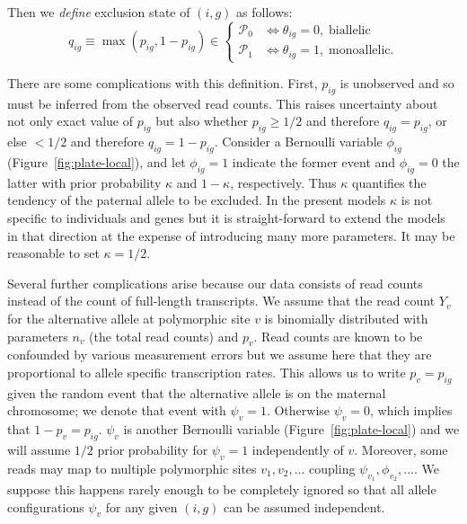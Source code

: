 \documentclass[letterpaper]{article}
\begin{document}
Then we \emph{define} exclusion state of \((i,g)\) as follows:
\begin{equation}
\label{eq:def-exclusion-state}
q_{ig} \equiv \max(p_{ig},1-p_{ig}) \in
\begin{cases}
\mathcal{P}_0 & \Leftrightarrow \theta_{ig}=0, \; \text{biallelic} \\
\mathcal{P}_1 & \Leftrightarrow \theta_{ig}=1, \; \text{monoallelic}.
\end{cases}
\end{equation}

There are some complications with this definition.  First, \(p_{ig}\) is
unobserved and so must be inferred from the observed read counts.  This raises
uncertainty about not only exact value of \(p_{ig}\) but also whether
\(p_{ig}\ge 1/2\) and therefore \(q_{ig}=p_{ig}\), or else \(<1/2\) and therefore
\(q_{ig}=1-p_{ig}\).  Consider a Bernoulli variable \(\phi_{ig}\)
(Figure~\ref{fig:plate-local}), and let \(\phi_{ig}=1\) indicate the former event and
\(\phi_{ig}=0\) the latter with prior probability \(\kappa\) and
\(1-\kappa\), respectively.  Thus \(\kappa\) quantifies the tendency of the
paternal allele to be excluded. In the present models \(\kappa\) is not
specific to individuals and genes but it is straight-forward to extend the
models in that direction at the expense of introducing many more parameters.
It may be reasonable to set \(\kappa=1/2\).

Several further complications arise because our data consists of read counts
instead of the count of full-length transcripts.  We assume that the read
count \(Y_v\) for the alternative allele at polymorphic site \(v\) is
binomially distributed with parameters \(n_v\) (the total read counts) and
\(p_{v}\).   Read counts are known to be confounded by various measurement
errors but we assume here that they are proportional to allele specific
transcription rates.  This allows us to write \(p_v = p_{ig}\) given the
random event that the alternative allele is on the maternal chromosome; we
denote that event with \(\psi_v=1\).  Otherwise \(\psi_v=0\), which implies
that \(1-p_v=p_{ig}\).  \(\psi_v\) is another Bernoulli variable
(Figure~\ref{fig:plate-local}) and we will assume \(1/2\) prior probability
for \(\psi_v=1\) independently of \(v\).  Moreover, some reads may map to
multiple polymorphic sites \(v_1,v_2,...\) coupling
\(\psi_{v_1},\phi_{v_2},...\).  We suppose this happens rarely enough to be
completely ignored so that all allele configurations \(\psi_v\) for any given
\((i,g)\) can be assumed independent.
\end{document}
